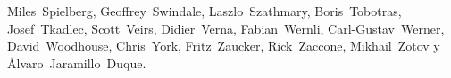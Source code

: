 {Miles~Spielberg,           %
Geoffrey~Swindale,         %
Laszlo~Szathmary,          %
Boris~Tobotras,            %
Josef~Tkadlec,             %
Scott~Veirs,               %
Didier~Verna,              %
Fabian~Wernli,             %
Carl-Gustav~Werner,        %
David~Woodhouse,           %
Chris~York,                %
Fritz~Zaucker,             %
Rick~Zaccone,              %
Mikhail~Zotov              %
y Álvaro~Jaramillo~Duque.  %
}


\pagebreak
\endinput
% 

